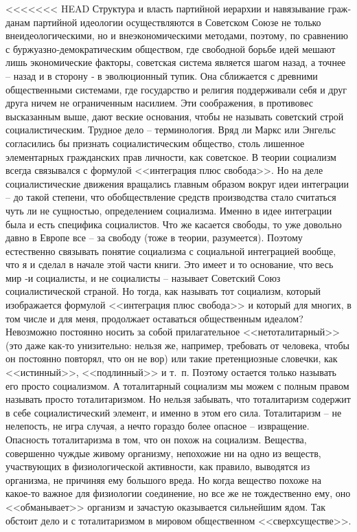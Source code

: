 \documentclass{book}
\begin{document}
<<<<<<< HEAD
Структура и власть партийной иерархии и навязывание граж­данам партийной идеологии осуществляются в Советском Союзе не только внеидеологическими, но и внеэкономическими мето­дами, поэтому, по сравнению с буржуазно‑демократическим обществом, где свободной борьбе идей мешают лишь экономи­ческие факторы, советская система является шагом назад, а точнее -- назад и в сторону ‑ в эволюционный тупик. Она сбли­жается с древними общественными системами, где государст­во и религия поддерживали себя и друг друга ничем не огра­ниченным насилием. Эти соображения, в противовес высказан­ным выше, дают веские основания, чтобы не называть совет­ский строй социалистическим. Трудное дело -- терминология. Вряд ли Маркс или Энгельс согласились бы признать социали­стическим общество, столь лишенное элементарных граждан­ских прав личности, как советское. В теории социализм всегда связывался с формулой <<интеграция плюс свобода>>. Но на де­ле социалистические движения вращались главным образом вокруг идеи интеграции -- до такой степени, что обобществле­ние средств производства стало считаться чуть ли не сущностью, определением социализма. Именно в идее интеграции была и есть специфика социалистов. Что же касается свободы, то уже довольно давно в Европе все -- за свободу (тоже в теории, разумеется). Поэтому естественно связывать понятие социализма с социальной интеграцией вообще, что я и сделал в нача­ле этой части книги. Это имеет и то основание, что весь мир ‑и социалисты, и не социалисты -- называет Советский Союз социалистической страной. Но тогда, как называть тот социа­лизм, который изображается формулой <<интеграция плюс сво­бода>> и который для многих, в том числе и для меня, продол­жает оставаться общественным идеалом? Невозможно постоян­но носить за собой прилагательное <<нетоталитарный>> (это да­же как‑то унизительно: нельзя же, например, требовать от че­ловека, чтобы он постоянно повторял, что он не вор) или та­кие претенциозные словечки, как <<истинный>>, <<подлинный>> и т.~п. Поэтому остается только называть его просто социализ­мом. А тоталитарный социализм мы можем с полным правом называть просто тоталитаризмом. Но нельзя забывать, что тоталитаризм содержит в себе социалистический элемент, и именно в этом его сила. Тоталитаризм -- не нелепость, не игра случая, а нечто гораздо более опасное -- извращение. Опасность тоталитаризма в том, что он похож на социализм.  Вещества, совершенно чуждые живому организму, непохожие ни на одно из веществ, участвующих в физиологической активности, как правило, выводятся из организма, не причиняя ему большого вреда. Но когда вещество похоже на какое‑то важное для фи­зиологии соединение, но все же не тождественно ему, оно <<об­манывает>> организм и зачастую оказывается сильнейшим ядом. Так обстоит дело и с тоталитаризмом в мировом общественном <<сверхсуществе>>.
\end{document}
